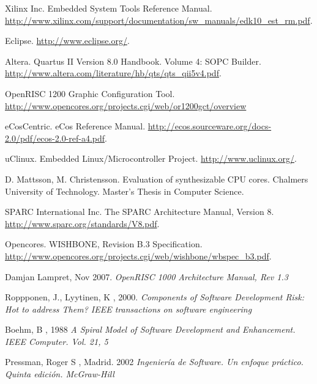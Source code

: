 \documentclass[a4paper,12pt]{report}
\begin{document}
\begin{thebibliography}{99}
Xilinx Inc. Embedded System Tools Reference Manual.  \url{http://www.xilinx.com/support/documentation/sw_manuals/edk10_est_rm.pdf}.

Eclipse. 
\url{http://www.eclipse.org/}.

Altera. Quartus II Version 8.0 Handbook. Volume 4: SOPC Builder. 
\url{http://www.altera.com/literature/hb/qts/qts_qii5v4.pdf}.

OpenRISC 1200 Graphic Configuration Tool. \url{http://www.opencores.org/projects.cgi/web/or1200gct/overview}

 eCosCentric. eCos Reference Manual. \url{http://ecos.sourceware.org/docs-2.0/pdf/ecos-2.0-ref-a4.pdf}.

 uClinux. Embedded Linux/Microcontroller Project. \url{http://www.uclinux.org/}.

 D. Mattsson, M. Christensson. Evaluation of synthesizable CPU cores. Chalmers University of Technology. Master's Thesis in Computer Science.

 SPARC International Inc. The SPARC Architecture Manual, Version 8. 
\url{http://www.sparc.org/standards/V8.pdf}.

 Opencores. WISHBONE, Revision B.3 Specification.  \url{http://www.opencores.org/projects.cgi/web/wishbone/wbspec_b3.pdf}.



 Damjan Lampret, Nov 2007.
  \textit{OpenRISC 1000 Architecture Manual, Rev 1.3}

 Roppponen, J., Lyytinen, K , 2000. 
\textit{Components of Software Development Risk: Hot to address Them? IEEE transactions on software
engineering}

 Boehm, B , 1988  
\textit{A Spiral Model of Software Development and Enhancement. IEEE Computer. Vol. 21, 5} 

 Pressman, Roger S , Madrid. 2002
\textit{Ingeniería de Software. Un enfoque práctico. Quinta edición. McGraw-Hill} 


\end{thebibliography}
\end{document}
